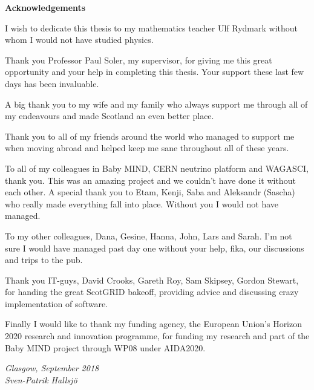 \vspace*{0.75in}

\begin{center} {\bf Acknowledgements}\end{center}

I wish to dedicate this thesis to my mathematics teacher Ulf Rydmark without whom I would not have studied physics.

Thank you Professor Paul Soler,  my supervisor, for giving me this great opportunity and your help in completing this thesis. Your support these last few days has been invaluable.

A big thank you to my wife and my family who always support me through all of my endeavours and made Scotland an even better place.

Thank you to all of my friends around the world who managed to support me when moving abroad and helped keep me sane throughout all of these years. 

To all of my colleagues in Baby MIND, CERN neutrino platform and WAGASCI, thank you. This was an amazing project and we couldn't have done it without each other. A special thank you to Etam, Kenji, Saba and Aleksandr (Sascha) who really made everything fall into place. Without you I would not have managed.

To my other colleagues, Dana, Gesine, Hanna, John, Lars and Sarah. I'm not sure I would have managed past day one without your help, fika, our discussions and trips to the pub.

Thank you IT-guys, David Crooks, Gareth Roy, Sam Skipsey, Gordon Stewart, for handing the great ScotGRID bakeoff, providing advice and discussing crazy implementation of software.

Finally I would like to thank my funding agency, the European Union's Horizon 2020 research and innovation programme, for funding my research and part of the Baby MIND project through WP08 under AIDA2020. 

\begin{flushright} \textit{Glasgow, September 2018 \\ Sven-Patrik Hallsj{\"o}}\end{flushright}




